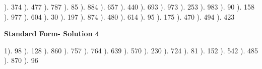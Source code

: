 \documentclass{article}%
\begin{document}
). 374%
). 477%
). 787%
). 85%
). 884%
). 657%
). 440%
). 693%
). 973%
). 253%
). 983%
). 90%
). 158%
). 977%
). 604%
). 30%
). 197%
). 874%
). 480%
). 614%
). 95%
). 175%
). 470%
). 494%
). 423%
\newline%
\newpage%
\large%
\begin{center}%
\textbf{Standard Form- Solution 4}%
\newline%
\end{center} \normalsize%
1). 98%
). 128%
). 860%
). 757%
). 764%
). 639%
). 570%
). 230%
). 724%
). 81%
). 152%
). 542%
). 485%
). 870%
). 96%
\end{document}
